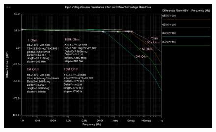 \documentclass[12pt]{article}
\begin{document}
\FloatBarrier
\begin{figure}[h!]
\begin{center}
 \includegraphics[scale=0.25]{./resistance.png}
\end{center}
\end{figure}
\FloatBarrier
\end{document}
